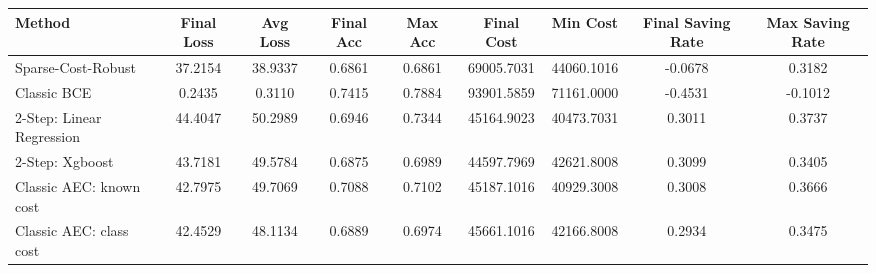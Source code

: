 \begin{tabular}{lcccccccc}
\toprule
Method & Final Loss & Avg Loss & Final Acc & Max Acc & Final Cost & Min Cost & Final Saving Rate & Max Saving Rate \\
\midrule
Sparse-Cost-Robust & 37.2154 & 38.9337 & 0.6861 & 0.6861 & 69005.7031 & 44060.1016 & -0.0678 & 0.3182 \\
Classic BCE & 0.2435 & 0.3110 & 0.7415 & 0.7884 & 93901.5859 & 71161.0000 & -0.4531 & -0.1012 \\
2-Step: Linear Regression & 44.4047 & 50.2989 & 0.6946 & 0.7344 & 45164.9023 & 40473.7031 & 0.3011 & 0.3737 \\
2-Step: Xgboost & 43.7181 & 49.5784 & 0.6875 & 0.6989 & 44597.7969 & 42621.8008 & 0.3099 & 0.3405 \\
Classic AEC: known cost & 42.7975 & 49.7069 & 0.7088 & 0.7102 & 45187.1016 & 40929.3008 & 0.3008 & 0.3666 \\
Classic AEC: class cost & 42.4529 & 48.1134 & 0.6889 & 0.6974 & 45661.1016 & 42166.8008 & 0.2934 & 0.3475 \\
\bottomrule
\end{tabular}
